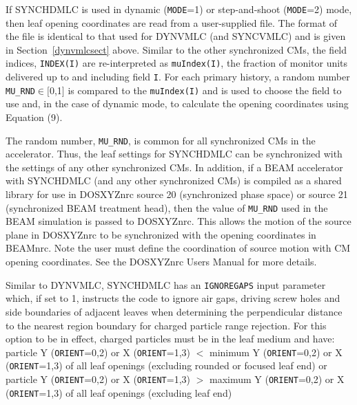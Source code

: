 \documentclass[12pt,twoside]{article}
\begin{document}
If SYNCHDMLC is used in dynamic ({\tt MODE}=1) or step-and-shoot ({\tt MODE}=2) mode, then
leaf opening coordinates are read from a user-supplied file.  The format of the file
is identical to that used for DYNVMLC (and SYNCVMLC) and is given in
Section~\ref{dynvmlcsect} above.  Similar to the other synchronized CMs, the field indices,
{\tt INDEX(I)} are re-interpreted as {\tt muIndex(I)}, the fraction of monitor units delivered
up to and including field {\tt I}.  For each primary history, a random number {\tt MU\_RND}$\in[$0,1$]$ is
compared to the {\tt muIndex(I)} and is used to choose the field to use and,
in the case of dynamic mode, to calculate the opening coordinates using Equation (9).

The random number, {\tt MU\_RND}, is common for all synchronized CMs in the accelerator.  Thus, the
leaf settings for SYNCHDMLC can be synchronized with the settings of any other synchronized CMs.  In addition,
if a BEAM accelerator with SYNCHDMLC (and any other synchronized CMs) is compiled as a shared library for use
in DOSXYZnrc source 20 (synchronized phase space) or source 21 (synchronized BEAM treatment head), then
the value of {\tt MU\_RND} used in the BEAM simulation is passed to DOSXYZnrc.  This allows the motion of the source
plane in DOSXYZnrc to be synchronized with the opening coordinates in BEAMnrc.  Note the user must
define the coordination of source motion with CM opening coordinates.  See the DOSXYZnrc Users Manual\cite{Wa05}
for more details.

Similar to DYNVMLC, SYNCHDMLC has an {\tt IGNOREGAPS} input parameter which, if set to 1, instructs the code to ignore
air gaps, driving screw holes and side boundaries of adjacent
leaves when determining the perpendicular
distance to the nearest region boundary for
charged particle range rejection.  For this option to be in effect, charged particles must be in the leaf medium and have:\\
particle Y ({\tt ORIENT}=0,2) or X ({\tt ORIENT}=1,3) $<$ minimum Y ({\tt ORIENT}=0,2) or X ({\tt ORIENT}=1,3) of all leaf openings
(excluding rounded or focused leaf end) or\\
particle Y ({\tt ORIENT}=0,2) or X ({\tt ORIENT}=1,3) $>$ maximum Y ({\tt ORIENT}=0,2) or X ({\tt ORIENT}=1,3) of all leaf openings (excluding leaf end)\\

\end{document}
